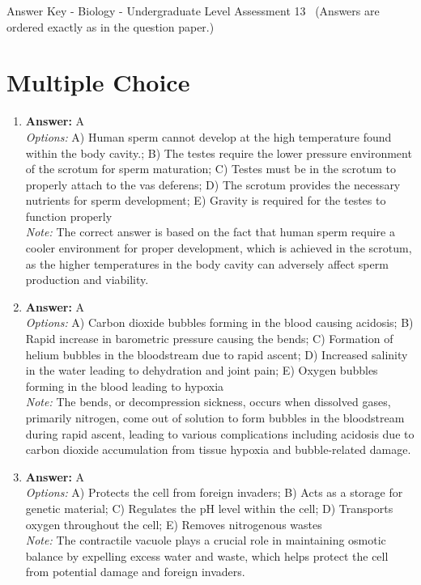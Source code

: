 \documentclass[12pt]{article}
\begin{document}
\begin{center}
Answer Key - Biology - Undergraduate Level Assessment 13 \
\small (Answers are ordered exactly as in the question paper.)
\end{center}

\section*{Multiple Choice}
\begin{enumerate}[label=\arabic*.]
\item \textbf{Answer:} A
\\ \textit{Options:} A) Human sperm cannot develop at the high temperature found within the body cavity.; B) The testes require the lower pressure environment of the scrotum for sperm maturation; C) Testes must be in the scrotum to properly attach to the vas deferens; D) The scrotum provides the necessary nutrients for sperm development; E) Gravity is required for the testes to function properly
\\ \textit{Note:} The correct answer is based on the fact that human sperm require a cooler environment for proper development, which is achieved in the scrotum, as the higher temperatures in the body cavity can adversely affect sperm production and viability.
\item \textbf{Answer:} A
\\ \textit{Options:} A) Carbon dioxide bubbles forming in the blood causing acidosis; B) Rapid increase in barometric pressure causing the bends; C) Formation of helium bubbles in the bloodstream due to rapid ascent; D) Increased salinity in the water leading to dehydration and joint pain; E) Oxygen bubbles forming in the blood leading to hypoxia
\\ \textit{Note:} The bends, or decompression sickness, occurs when dissolved gases, primarily nitrogen, come out of solution to form bubbles in the bloodstream during rapid ascent, leading to various complications including acidosis due to carbon dioxide accumulation from tissue hypoxia and bubble-related damage.
\item \textbf{Answer:} A
\\ \textit{Options:} A) Protects the cell from foreign invaders; B) Acts as a storage for genetic material; C) Regulates the pH level within the cell; D) Transports oxygen throughout the cell; E) Removes nitrogenous wastes
\\ \textit{Note:} The contractile vacuole plays a crucial role in maintaining osmotic balance by expelling excess water and waste, which helps protect the cell from potential damage and foreign invaders.

\end{enumerate}
\end{document}
